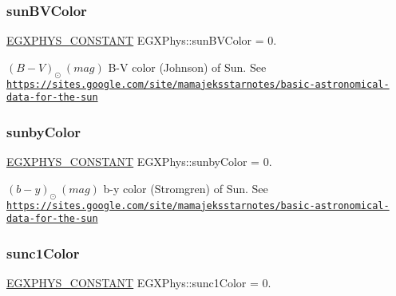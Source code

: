 \subsubsection{\texorpdfstring{sun\+B\+V\+Color}{sunBVColor}}
{\footnotesize\ttfamily \mbox{\hyperlink{group___e_g_x_phys-_constants-_macros_ga76980d288494ce1714c9ac68a95ba702}{E\+G\+X\+P\+H\+Y\+S\+\_\+\+C\+O\+N\+S\+T\+A\+NT}} E\+G\+X\+Phys\+::sun\+B\+V\+Color = 0.}

$ (B-V)_{\odot} \ (mag)$ B-\/V color (Johnson) of Sun. See \href{https://sites.google.com/site/mamajeksstarnotes/basic-astronomical-data-for-the-sun}{\tt https\+://sites.\+google.\+com/site/mamajeksstarnotes/basic-\/astronomical-\/data-\/for-\/the-\/sun} \mbox{\label{group___e_g_x_phys-_constants-_astrophysics-_solar_system-_sun-_magnitude_ga9568dbf869849bba7ab4223ef162e9ca}} 
\subsubsection{\texorpdfstring{sunby\+Color}{sunbyColor}}
{\footnotesize\ttfamily \mbox{\hyperlink{group___e_g_x_phys-_constants-_macros_ga76980d288494ce1714c9ac68a95ba702}{E\+G\+X\+P\+H\+Y\+S\+\_\+\+C\+O\+N\+S\+T\+A\+NT}} E\+G\+X\+Phys\+::sunby\+Color = 0.}

$ (b-y)_{\odot} \ (mag)$ b-\/y color (Stromgren) of Sun. See \href{https://sites.google.com/site/mamajeksstarnotes/basic-astronomical-data-for-the-sun}{\tt https\+://sites.\+google.\+com/site/mamajeksstarnotes/basic-\/astronomical-\/data-\/for-\/the-\/sun} \mbox{\label{group___e_g_x_phys-_constants-_astrophysics-_solar_system-_sun-_magnitude_ga3783eaaa554c73254c8c8c85817432c5}} 
\subsubsection{\texorpdfstring{sunc1\+Color}{sunc1Color}}
{\footnotesize\ttfamily \mbox{\hyperlink{group___e_g_x_phys-_constants-_macros_ga76980d288494ce1714c9ac68a95ba702}{E\+G\+X\+P\+H\+Y\+S\+\_\+\+C\+O\+N\+S\+T\+A\+NT}} E\+G\+X\+Phys\+::sunc1\+Color = 0.}

